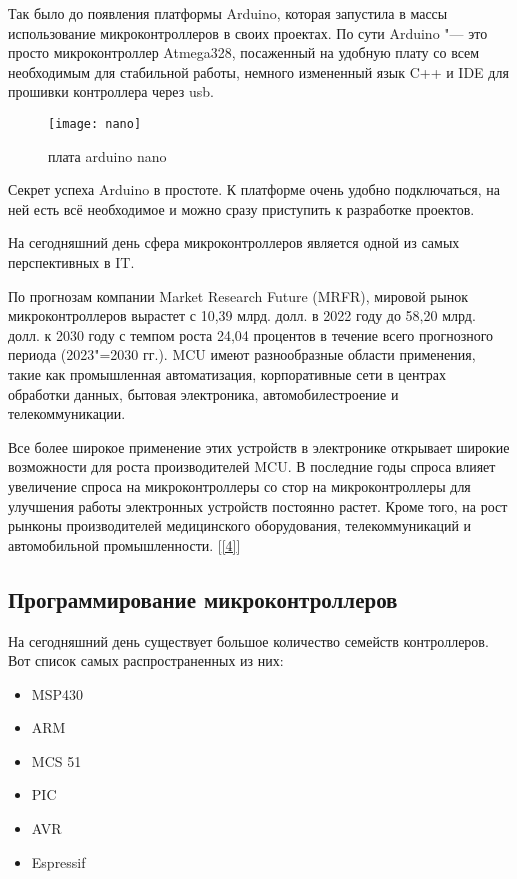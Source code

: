 \documentclass[14pt,a4paper]{extarticle}
\begin{document}
	Так было до появления платформы Arduino, которая запустила в массы использование микроконтроллеров в своих проектах. По сути Arduino "--- это просто микроконтроллер Atmega328, посаженный на удобную плату со всем необходимым для стабильной работы, немного измененный язык C++ и IDE для прошивки контроллера через usb.
	
	\begin{figure}[H]
		\centering
		\texttt{[image: nano]}
		\caption[]{плата arduino nano}
		\label{nano}
	\end{figure}
	
	Секрет успеха Arduino в простоте. К платформе очень удобно подключаться, на ней есть всё необходимое и можно сразу приступить к разработке проектов.
	
	На сегодняшний день сфера микроконтроллеров является одной из самых перспективных в IT.
	
	По прогнозам компании Market Research Future (MRFR), мировой рынок микроконтроллеров вырастет с 10,39 млрд. долл. в 2022 году до 58,20 млрд. долл. к 2030 году с темпом роста 24,04 процентов в течение всего прогнозного периода (2023"=2030 гг.). MCU имеют разнообразные области применения, такие как промышленная автоматизация, корпоративные сети в центрах обработки данных, бытовая электроника, автомобилестроение и телекоммуникации.
	
	Все более широкое применение этих устройств в электронике открывает широкие возможности для роста производителей MCU. В последние годы спроса влияет увеличение спроса на микроконтроллеры со стор на микроконтроллеры для улучшения работы электронных устройств постоянно растет. Кроме того, на рост рынконы производителей медицинского оборудования, телекоммуникаций и автомобильной промышленности. [\ref{4}] 
	
	\subsection{Программирование микроконтроллеров } 
	
	На сегодняшний день существует большое количество семейств контроллеров. Вот список самых распространенных из них:
	
	\begin{itemize}
		\item MSP430
		\item ARM
		\item MCS 51
		\item PIC
		\item AVR
		\item Espressif
	\end{itemize}
	
\end{document}
